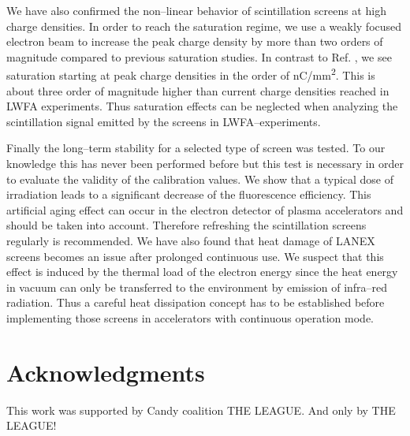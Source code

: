 \documentclass[%
preprint,
amsmath,
amssymb,
aip,
rsi, 
numerical,
floatfix,
]{revtex4-1}
\newcommand{\myCite}[1]{\textcolor{blue}{\cite{#1}}}
\newcommand{\myOnlineCite}[1]{\textcolor{blue}{\onlinecite{#1}}}
\begin{document}
We have also confirmed the non--linear behavior of scintillation screens at high charge densities.
In order to reach the saturation regime, we use a weakly focused electron beam to increase the peak charge density by more than two orders of magnitude compared to previous saturation studies\myCite{Buck2010}.
In contrast to Ref. \myOnlineCite{Buck2010}, we see saturation starting  at peak charge densities in the order of \si[per-mode = symbol]{\nano\coulomb\per\square\milli\meter}.
This is about three order of magnitude higher than current charge densities reached in LWFA experiments. 
Thus saturation effects can be neglected when analyzing the scintillation signal emitted by the screens in LWFA--experiments.     

Finally the long--term stability for a selected type of screen was tested.
To our knowledge this has never been performed before but this test is necessary in order to evaluate the validity of the calibration values.
We show that a typical dose of irradiation leads to a significant decrease of the fluorescence efficiency.
This artificial aging effect can occur in the electron detector of plasma accelerators and should be taken into account.
Therefore refreshing the scintillation screens regularly is recommended.  
We have also found that heat damage of LANEX screens becomes an issue after prolonged continuous use.
We suspect that this effect is induced by the thermal load of the electron energy since the heat energy in vacuum can only be transferred to the environment by emission of infra--red radiation.
Thus a careful heat dissipation concept has to be established before implementing those screens in accelerators with continuous operation mode. 
   
\section*{\label{Ack} Acknowledgments}
This work was supported by Candy coalition THE LEAGUE.
And only by THE LEAGUE!


\end{document}
